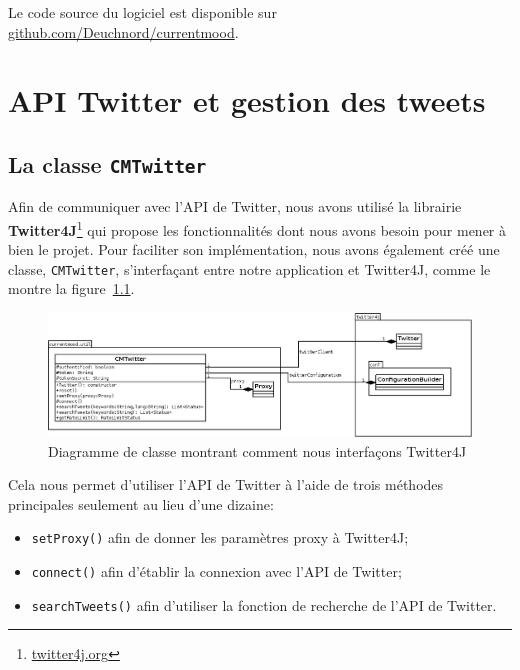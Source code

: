 \documentclass[12pt,a4paper]{report}
\begin{document}
Le code source du logiciel est disponible sur
\href{http://github.com/Deuchnord/currentmood}{github.com/Deuchnord/currentmood}.


\chapter{API Twitter et gestion des tweets}

\section{La classe \texttt{CMTwitter}}

Afin de communiquer avec l'API de Twitter, nous avons utilisé la librairie
\textbf{Twitter4J}\footnote{\href{http://twitter4j.org}{twitter4j.org}} qui
propose les fonctionnalités dont nous avons besoin pour mener à bien le projet.
Pour faciliter son implémentation, nous avons également créé une classe,
\texttt{CMTwitter}, s'interfaçant entre notre application et Twitter4J, comme le
montre la figure~\ref{uml_cmtwitter}.

\begin{figure}[h]
	\includegraphics[width=1\textwidth]{img/uml_cmtwitter.png}
	\caption{Diagramme de classe montrant comment nous interfaçons Twitter4J}
	\label{uml_cmtwitter}
\end{figure}

Cela nous permet d'utiliser l'API de Twitter à l'aide de trois méthodes
principales seulement au lieu d'une dizaine:

\begin{itemize}
	\item
		\texttt{setProxy()} afin de donner les paramètres proxy à Twitter4J;
	\item
		\texttt{connect()} afin d'établir la connexion avec l'API de Twitter;
	\item
		\texttt{searchTweets()} afin d'utiliser la fonction de recherche de
		l'API de Twitter.
\end{itemize}
\end{document}
